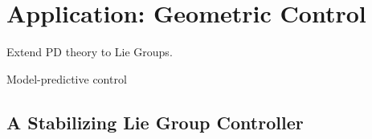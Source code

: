 
\chapter{Application: Geometric Control}

\begin{itemize_outcomes}
  \item Extend PD theory to Lie Groups.
  \item Model-predictive control
\end{itemize_outcomes}

\section{A Stabilizing Lie Group Controller}

